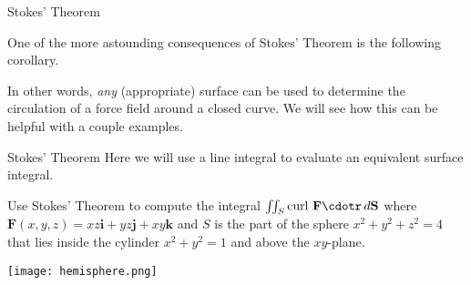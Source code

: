 \documentclass[11pt,english,
handout
]{beamer}
\begin{document}
\begin{frame}[t]{Stokes' Theorem}
\small

One of the more astounding consequences of Stokes' Theorem is the following corollary.

\lspace
{} 


\lspace
In other words, \textit{any} (appropriate) surface can be used to determine the circulation of a force field around a closed curve. We will see how this can be helpful with a couple examples.
\end{frame}






\begin{frame}[t]{Stokes' Theorem}
\small
Here we will use a line integral to evaluate an equivalent surface integral.\pause 

\begin{example}
Use Stokes' Theorem to compute the integral $\iint_S\text{curl }\mathbf{F}\cdotr\,d\mathbf{S}$ where $\mathbf{F}(x,y,z)=xz\mathbf{i}+yz\mathbf{j}+xy\mathbf{k}$ and $S$ is the part of the sphere $x^2+y^2+z^2=4$ that lies inside the cylinder $x^2+y^2=1$ and above the $xy$-plane.

\begin{center}
\texttt{[image: hemisphere.png]}
\end{center}
\end{example}
\end{frame}
\end{document}
